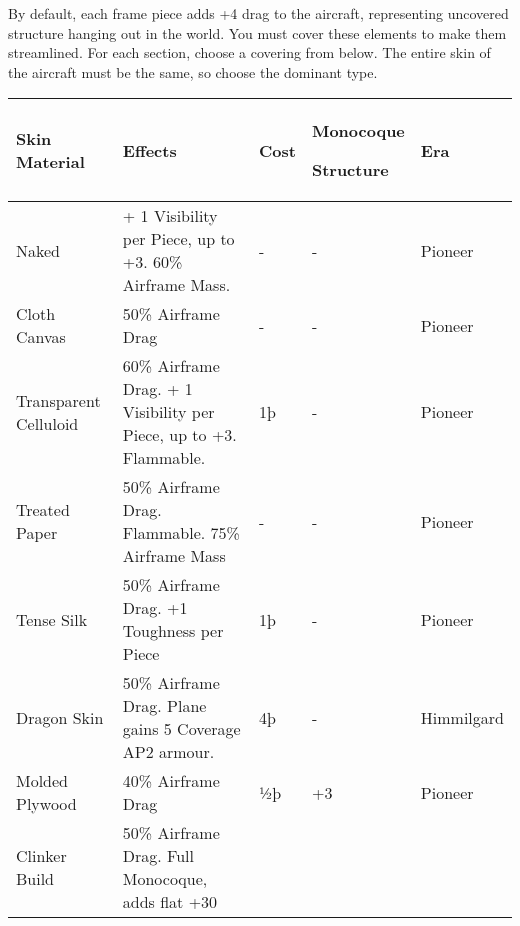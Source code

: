 \documentclass{article}
\begin{document}
By default, each frame piece adds +4 drag to the aircraft,
representing uncovered structure hanging out in the world. You must
cover these elements to make them streamlined. For each section, choose
a covering from below. The entire skin of the aircraft must be the same,
so choose the dominant type.

\begin{tabular}{|l|l|l|l|l|}
  \hline
  Skin Material                & Effects                                                 & Cost       & Monocoque

  Structure                    & Era                                                                                          \\\hline
  Naked                        & + 1 Visibility per Piece, up to +3. 60\% Airframe Mass. & -          & -
                               & Pioneer                                                                                      \\\hline
  Cloth Canvas                 & 50\% Airframe Drag                                      & -          & -           & Pioneer \\\hline
  Transparent Celluloid        & {60\% Airframe Drag. + 1 Visibility per
  Piece, up to +3. Flammable.} & {1þ}                                                    & {-}        &
  {Pioneer}                                                                                                                   \\\hline
  Treated Paper                & 50\% Airframe Drag. Flammable. 75\% Airframe Mass       & -          &
  -                            & Pioneer                                                                                      \\\hline
  Tense Silk                   & 50\% Airframe Drag. +1 Toughness per Piece              & 1þ         & -           &
  Pioneer                                                                                                                     \\\hline
  Dragon Skin                  & 50\% Airframe Drag. Plane gains 5 Coverage AP2 armour.  &
  4þ                           & -                                                       & Himmilgard                         \\\hline
  Molded Plywood               & 40\% Airframe Drag                                      & ½þ         & +3          & Pioneer \\\hline
  Clinker Build                & 50\% Airframe Drag. Full Monocoque, adds flat +30

\end{tabular}
\end{document}
